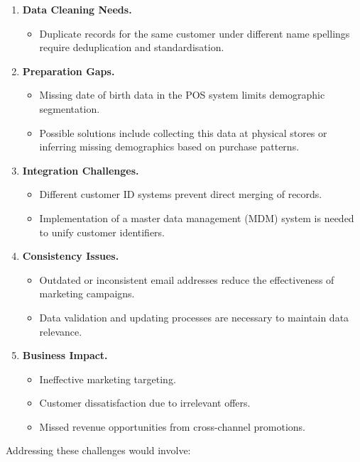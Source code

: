 \begin{enumerate}
	\item \textbf{Data Cleaning Needs.}
	\begin{itemize}
		\item Duplicate records for the same customer under different name spellings require deduplication and standardisation.
	\end{itemize}
	
	\item \textbf{Preparation Gaps.}
	\begin{itemize}
		\item Missing date of birth data in the POS system limits demographic segmentation.
		\item Possible solutions include collecting this data at physical stores or inferring missing demographics based on purchase patterns.
	\end{itemize}
	
	\item \textbf{Integration Challenges.}
	\begin{itemize}
		\item Different customer ID systems prevent direct merging of records.
		\item Implementation of a master data management (MDM) system is needed to unify customer identifiers.
	\end{itemize}
	
	\item \textbf{Consistency Issues.}
	\begin{itemize}
		\item Outdated or inconsistent email addresses reduce the effectiveness of marketing campaigns.
		\item Data validation and updating processes are necessary to maintain data relevance.
	\end{itemize}
	
	\item \textbf{Business Impact.}
	\begin{itemize}
		\item Ineffective marketing targeting.
		\item Customer dissatisfaction due to irrelevant offers.
		\item Missed revenue opportunities from cross-channel promotions.
	\end{itemize}
\end{enumerate}

Addressing these challenges would involve:


